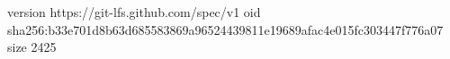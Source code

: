 version https://git-lfs.github.com/spec/v1
oid sha256:b33e701d8b63d685583869a96524439811e19689afac4e015fc303447f776a07
size 2425
